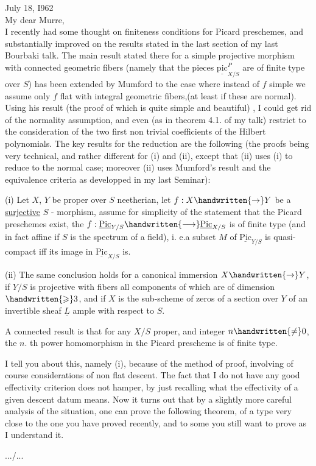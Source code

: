 July 18, I962\\

My dear Murre,\\

I recently had some thought on finiteness conditions for Picard preschemes, and substantially improved on the results stated in the last section of my last Bourbaki talk. The main result stated there for a simple projective morphism with connected geometric fibers (namely that the pieces $\underline{\mathrm{pic}}^{P}_{X/S}$ are of finite type over $S$) has been extended by Mumford to the case where instead of $f$ simple we assume only $f$ flat with integral geometric fibers,(at least if these are normal). Using his result (the proof of which is quite simple and beautiful) , I could get rid of the normality assumption, and even (as in theorem 4.1. of my talk) restrict to the consideration of the two first non trivial coefficients of the Hilbert polynomials. The key results for the reduction are the following (the proofs being very technical, and rather different for (i) and (ii), except that (ii) uses (i) to reduce to the normal case; moreover (ii) uses Mumford's result and the equivalence criteria as developped in my last Seminar):

(i) Let $X$, $Y$ be proper over $S$ neetherian, let $f:X\handwritten{\to}Y$ be a \uline{surjective} $S$ - morphism, assume for simplicity of the statement that the Picard preschemes exist, the $f:\underline{\mathrm{Pic}}_{Y/S}\handwritten{\longrightarrow}\underline{\mathrm{Pic}}_{X/S}$ is of finite type (and in fact affine if $S$ is the spectrum of a field), i. e.a subset $M$ of $\underline{\mathrm{Pic}}_{Y/S}$ is quasi-compact iff its image in $\underline{\mathrm{Pic}}_{X/S}$ is.

(ii) The same conclusion holds for a canonical immersion $X\handwritten{\to}Y$, if $Y/S$ is projective with fibers all components of which are of dimension $\handwritten{\geqslant}3$, and if $X$ is the sub-scheme of zeros of a section over $Y$ of an invertible sheaf $\underline{L}$ ample with respect to $S$.

A connected result is that for any $X/S$ proper, and integer $n\handwritten{\ne}0$, the $n$. th power homomorphism in the Picard prescheme is of finite type.

I tell you about this, namely (i), because of the method of proof, involving of course considerations of non flat descent. The fact that I do not have any good effectivity criterion does not hamper, by just recalling what the effectivity of a given descent datum means. Now it turns out that by a slightly more careful analysis of the situation, one can prove the following theorem, of a type very close to the one you have proved recently, and to some you still want to prove as I understand it.

\hfill .../...\par
